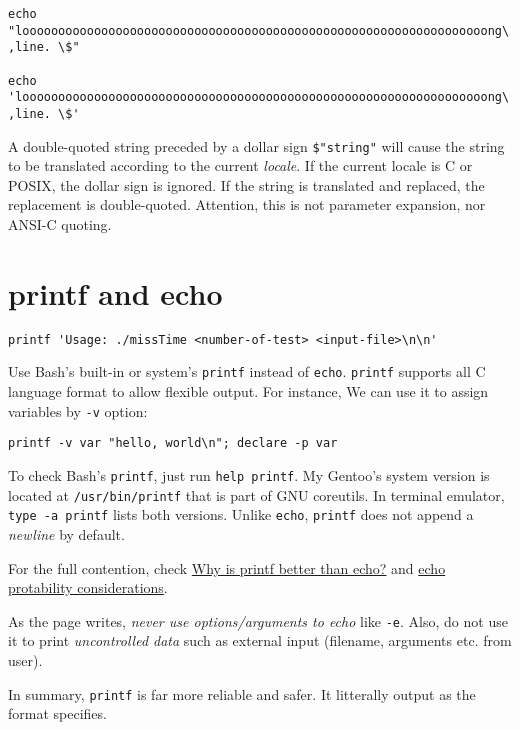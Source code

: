 \begin{lstlisting}
echo "looooooooooooooooooooooooooooooooooooooooooooooooooooooooooooooooong\
,line. \$"

echo 'looooooooooooooooooooooooooooooooooooooooooooooooooooooooooooooooong\
,line. \$'
\end{lstlisting}

A double-quoted string preceded by a dollar sign
\lstinline|$"string"| will cause the string to be translated
according to the current \textit{locale}.  If the current locale
is C or POSIX, the dollar sign is ignored.  If the string is
translated and replaced, the replacement is
double-quoted. Attention, this is not parameter expansion, nor
ANSI-C quoting.

\section{printf and echo}
\label{sec:printf-echo}

\begin{lstlisting}
printf 'Usage: ./missTime <number-of-test> <input-file>\n\n'
\end{lstlisting}

Use Bash's built-in or system's \lstinline|printf| instead of
\lstinline|echo|. \lstinline|printf| supports all C language
format to allow flexible output. For instance, We can use it to
assign variables by \lstinline|-v| option:

\begin{lstlisting}
printf -v var "hello, world\n"; declare -p var
\end{lstlisting}

To check Bash's \lstinline|printf|, just run
\lstinline|help printf|. My Gentoo's system version is located at
\lstinline|/usr/bin/printf| that is part of GNU coreutils. In
terminal emulator, \lstinline|type -a printf| lists both
versions. Unlike \lstinline|echo|, \lstinline|printf| does not
append a \textit{newline} by default.

For the full contention, check
\href{https://unix.stackexchange.com/q/65803/74407}{Why is printf
  better than echo?} and
\href{https://wiki.bash-hackers.org/commands/builtin/echo}{echo
  protability considerations}.

As the page writes, \textit{never use options/arguments to echo}
like \verb|-e|. Also, do not use it to print \textit{uncontrolled
  data} such as external input (filename, arguments etc. from user).

In summary, \lstinline|printf| is far more reliable and safer. It
litterally output as the format specifies.

